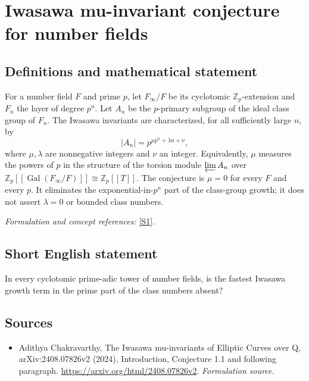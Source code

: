 \documentclass[11pt]{article}
\begin{document}
\section*{\texorpdfstring{Iwasawa mu-invariant conjecture for number fields}{Iwasawa mu-invariant conjecture for number fields}}\label{9400180}
\subsection{Definitions and mathematical statement}
For a number field $F$ and prime $p$, let $F_\infty/F$ be its cyclotomic ${\mathbb{Z}}_p$-extension and $F_n$ the layer of degree $p^n$. Let $A_n$ be the $p$-primary subgroup of the ideal class group of $F_n$. The Iwasawa invariants are characterized, for all sufficiently large $n$, by
\[
 |A_n|=p^{\mu p^n+\lambda n+\nu},
\]
where $\mu,\lambda$ are nonnegative integers and $\nu$ an integer. Equivalently, $\mu$ measures the powers of $p$ in the structure of the torsion module $\varprojlim A_n$ over ${\mathbb{Z}}_p[[\operatorname{Gal}(F_\infty/F)]]\cong{\mathbb{Z}}_p[[T]]$. The conjecture is $\mu=0$ for every $F$ and every $p$. It eliminates the exponential-in-$p^n$ part of the class-group growth; it does not assert $\lambda=0$ or bounded class numbers.
\par\smallskip\textit{Formulation and concept references:} \href{https://arxiv.org/html/2408.07826v2}{[S1]}.

\subsection{Short English statement}
In every cyclotomic prime-adic tower of number fields, is the fastest Iwasawa growth term in the prime part of the class numbers absent?
\subsection{Sources}
\begin{itemize}
\item[S1]Adithya Chakravarthy, The Iwasawa mu-invariants of Elliptic Curves over Q, arXiv:2408.07826v2 (2024), Introduction, Conjecture 1.1 and following paragraph.
\url{https://arxiv.org/html/2408.07826v2}.
\textit{Formulation source.}
\end{itemize}
\end{document}
